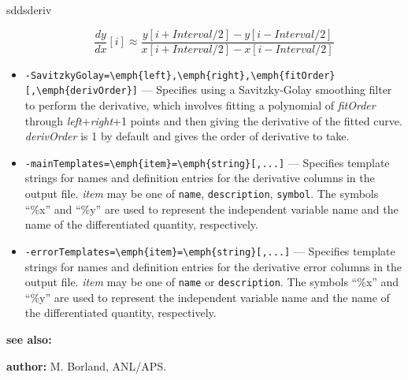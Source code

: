 \begin{sddsprog}{sddsderiv}
\begin{itemize}
        \[
        \frac{d y}{d x}[i] \approx \frac{y[i+\textit{Interval}/2] - y[i-\textit{Interval}/2]}{x[i+\textit{Interval}/2] - x[i-\textit{Interval}/2]}
        \]
      \item \verb|-SavitzkyGolay=\emph{left},\emph{right},\emph{fitOrder}[,\emph{derivOrder}]| --- Specifies using a Savitzky-Golay smoothing filter to perform the derivative, which involves fitting a polynomial of \emph{fitOrder} through \emph{left}+\emph{right}+1 points and then giving the derivative of the fitted curve. \emph{derivOrder} is 1 by default and gives the order of derivative to take.
      \item \verb|-mainTemplates=\emph{item}=\emph{string}[,...]| --- Specifies template strings for names and definition entries for the derivative columns in the output file. \emph{item} may be one of \verb|name|, \verb|description|, \verb|symbol|. The symbols ``\%x'' and ``\%y'' are used to represent the independent variable name and the name of the differentiated quantity, respectively.
      \item \verb|-errorTemplates=\emph{item}=\emph{string}[,...]| --- Specifies template strings for names and definition entries for the derivative error columns in the output file. \emph{item} may be one of \verb|name| or \verb|description|. The symbols ``\%x'' and ``\%y'' are used to represent the independent variable name and the name of the differentiated quantity, respectively.
    \end{itemize}
  \item \textbf{see also:} 
  \item \textbf{author:} M. Borland, ANL/APS.
\end{sddsprog}
